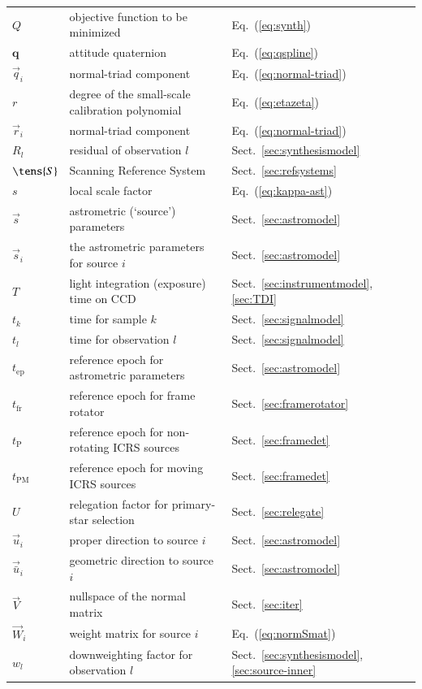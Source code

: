 \documentclass[structabstract]{aa}
\newcommand{\quat}[1]{\mathbf{#1}}
\begin{document}
\begin{longtable}{lll}
$Q$ & objective function to be minimized  & Eq.~(\ref{eq:synth}) \\
$\quat{q}$ & attitude quaternion & Eq.~(\ref{eq:qspline}) \\
$\vec{q}_i$ &  normal-triad component  & Eq.~(\ref{eq:normal-triad}) \\
$r$ & degree of the small-scale calibration polynomial & Eq.~(\ref{eq:etazeta}) \\
$\vec{r}_i$ &  normal-triad component  & Eq.~(\ref{eq:normal-triad}) \\
$R_l$ & residual of observation $l$  &  Sect.~\ref{sec:synthesismodel} \\
$\tens{S}$ & Scanning Reference System & Sect.~\ref{sec:refsystems} \\
$s$ & local scale factor & Eq.~(\ref{eq:kappa-ast}) \\
$\vec{s}$ & astrometric (`source') parameters & Sect.~\ref{sec:astromodel} \\
$\vec{s}_i$ & the astrometric parameters for source $i$ & Sect.~\ref{sec:astromodel} \\
$T$ & light integration (exposure) time on CCD & Sect.~\ref{sec:instrumentmodel}, \ref{sec:TDI}\\
$t_k$ & time for sample $k$  & Sect.~\ref{sec:signalmodel} \\
$t_l$ & time for observation $l$ & Sect.~\ref{sec:signalmodel} \\
$t_\text{ep}$ & reference epoch for astrometric parameters &Sect.~\ref{sec:astromodel} \\
$t_\text{fr}$ & reference epoch for frame rotator & Sect.~\ref{sec:framerotator} \\
$t_\text{P}$ & reference epoch for non-rotating ICRS sources & Sect.~\ref{sec:framedet}\\
$t_\text{PM}$ & reference epoch for moving ICRS sources  & Sect.~\ref{sec:framedet}\\
$U$ & relegation factor for primary-star selection & Sect.~\ref{sec:relegate} \\
$\vec{u}_i$ & proper direction to source $i$  &  Sect.~\ref{sec:astromodel} \\
$\vec{\bar{u}}_i$ & geometric direction to source $i$  &  Sect.~\ref{sec:astromodel} \\
$\vec{V}$ & nullspace of the normal matrix & Sect.~\ref{sec:iter} \\
$\vec{W}_i$ & weight matrix for source $i$ & Eq.~(\ref{eq:normSmat})\\
$w_l$ & downweighting factor for observation $l$ & Sect.~\ref{sec:synthesismodel}, \ref{sec:source-inner}\\

\end{longtable}
\end{document}
